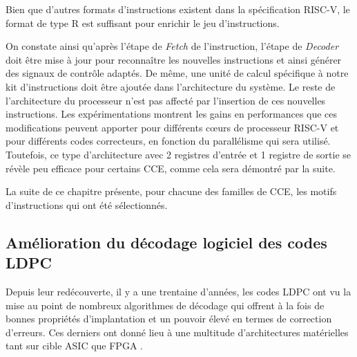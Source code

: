 \documentclass[../main.tex]{subfiles}
\begin{document}
Bien que d'autres formats d'instructions existent dans la spécification RISC-V, le format de type R est suffisant pour enrichir le jeu d'instructions. 

On constate ainsi qu'après l'étape de \textit{Fetch} de l'instruction, l'étape de \textit{Decoder} doit être mise à jour pour reconnaître les nouvelles instructions et ainsi générer des signaux de contrôle adaptés. 
De même, une unité de calcul spécifique à notre kit d'instructions doit être ajoutée dans l'architecture du système.
Le reste de l'architecture du processeur n'est pas affecté par l'insertion de ces nouvelles instructions.    
Les expérimentations montrent les gains en performances que ces modifications peuvent apporter pour différents cœurs de processeur RISC-V et pour différents codes correcteurs, en fonction du parallélisme qui sera utilisé.
Toutefois, ce type d’architecture avec 2 registres d’entrée et 1 registre de sortie se révèle peu efficace pour certains CCE, comme cela sera démontré par la suite. 

La suite de ce chapitre présente, pour chacune des familles de CCE, les motifs d'instructions qui ont été sélectionnés.

%
%
%
%
\subsection{Amélioration du décodage logiciel des codes LDPC}
%
%
%
%
Depuis leur redécouverte, il y a une trentaine d'années, les codes LDPC ont vu la mise au point de nombreux algorithmes de décodage qui offrent à la fois de bonnes propriétés d'implantation et un pouvoir élevé en termes de correction d'erreurs. Ces derniers ont donné lieu à une multitude d'architectures matérielles tant sur cible ASIC \cite{LDPC:APPROX:3} que FPGA \cite{LDPC:APPROX:4}. 
\end{document}
